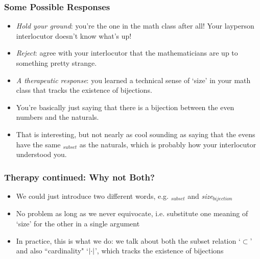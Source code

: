 \begin{frame}
\frametitle{Some Possible Responses}

\begin{itemize}[<+->]

\item \textit{Hold your ground}: you're the one in the math class after all! Your layperson interlocutor doesn't know what's up!

\item \textit{Reject}: agree with your interlocutor that the mathematicians are up to something pretty strange. 

\item \textit{A therapeutic response}: you learned a technical sense of `size' in your math class that tracks the existence of bijections. 
\bi
\item You're basically just saying that there is a bijection between the even numbers and the naturals. 
\item That is interesting, but not nearly as cool sounding as saying that the evens have the same $_{subset}$ as the naturals, which is probably how your interlocutor understood you.
\ei

\end{itemize}
\end{frame}

\begin{frame}
\frametitle{Therapy continued: Why not Both?}

\begin{itemize}[<+->]

\item We could just introduce two different words, e.g. $_{subset}$ and \emph{size}$_{bijection}$

\item No problem as long as we never equivocate, i.e. substitute one meaning of `size' for the other in a single argument

\item In practice, this is what we do: we talk about both the subset relation `$\subset$' and also ``cardinality" `$\left| \cdot \right|$', which tracks the existence of bijections

\end{itemize}
\end{frame}

